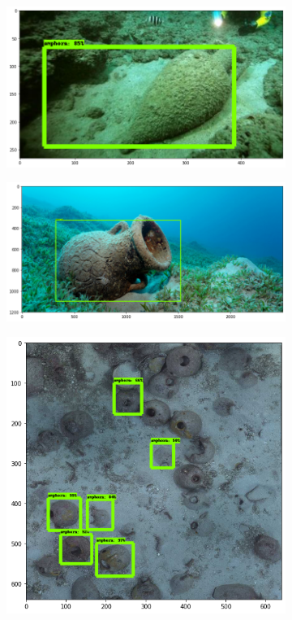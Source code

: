 \documentclass[a4paper, 11pt, oneside]{article}
\begin{document}
\begin{figure}[ht]
    \bigskip
    \begin{subfigure}[ht]{0.4\textwidth}
      \centering
      \includegraphics[width=\textwidth]{val_5.png}
    \end{subfigure}
    \begin{subfigure}[ht]{0.4\textwidth}
      \centering
      \includegraphics[width=\textwidth]{val_7.png}
    \end{subfigure}
    \bigskip
    \begin{subfigure}[ht]{0.4\textwidth}
      \centering
      \includegraphics[width=\textwidth]{val_4.png}

\end{subfigure}
\end{figure}
\end{document}
